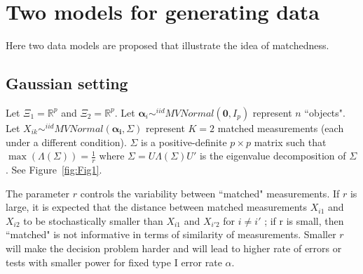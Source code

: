 \documentclass[11pt]{article} %
\begin{document}
\section{Two  models for generating data}
Here  two data models are proposed that illustrate the idea of matchedness.
\subsection{Gaussian setting\label{subsec:GaussianSet}}
	Let    $\Xi_1 = \mathbb{R}^{p}$ and $\Xi_2 = \mathbb{R}^{p}$.
  Let $\bm{\alpha}_i \sim^{iid} MVNormal(\bm{0},I_p)$ represent $n$ ``objects".  Let $X_{ik} \sim^{iid} MVNormal(\bm{\alpha_i},\Sigma)$ represent $K=2$ matched measurements (each under a different condition).
  $\Sigma$ is a positive-definite $p\times p$ matrix such that  $\max(\Lambda(\Sigma))=\frac{1}{r} $ where $\Sigma=U\Lambda(\Sigma)U'$  is the eigenvalue decomposition of $\Sigma$. See Figure~\ref{fig:Fig1}.

The parameter $r$ controls the variability between ``matched" measurements. If $r$ is large, it is expected that the distance between matched measurements
$X_{i1}$ and $X_{i2}$ to be stochastically smaller than $X_{i1}$ and $X_{i'2}$ for $i \neq i'$ ; if r is small, then ``matched" is not informative in terms of similarity of measurements.
 Smaller $r$ will make the decision problem harder and will lead to higher rate of errors or tests with smaller power for fixed type I error rate $\alpha$.
  
\end{document}
